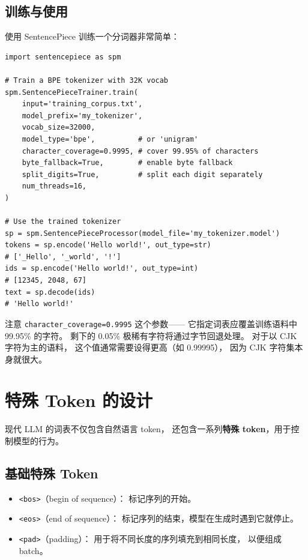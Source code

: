 \subsection{训练与使用}

使用 SentencePiece 训练一个分词器非常简单：

\begin{lstlisting}[caption={Training a SentencePiece tokenizer}]
import sentencepiece as spm

# Train a BPE tokenizer with 32K vocab
spm.SentencePieceTrainer.train(
    input='training_corpus.txt',
    model_prefix='my_tokenizer',
    vocab_size=32000,
    model_type='bpe',          # or 'unigram'
    character_coverage=0.9995, # cover 99.95% of characters
    byte_fallback=True,        # enable byte fallback
    split_digits=True,         # split each digit separately
    num_threads=16,
)

# Use the trained tokenizer
sp = spm.SentencePieceProcessor(model_file='my_tokenizer.model')
tokens = sp.encode('Hello world!', out_type=str)
# ['_Hello', '_world', '!']
ids = sp.encode('Hello world!', out_type=int)
# [12345, 2048, 67]
text = sp.decode(ids)
# 'Hello world!'
\end{lstlisting}

注意 \texttt{character\_coverage=0.9995} 这个参数——
它指定词表应覆盖训练语料中 99.95\% 的字符。
剩下的 0.05\% 极稀有字符将通过字节回退处理。
对于以 CJK 字符为主的语料，
这个值通常需要设得更高（如 0.99995），
因为 CJK 字符集本身就很大。

\section{特殊 Token 的设计}

现代 LLM 的词表不仅包含自然语言 token，
还包含一系列\textbf{特殊 token}，用于控制模型的行为。

\subsection{基础特殊 Token}

\begin{itemize}[noitemsep]
  \item \texttt{<bos>}（begin of sequence）：
        标记序列的开始。
  \item \texttt{<eos>}（end of sequence）：
        标记序列的结束，模型在生成时遇到它就停止。
  \item \texttt{<pad>}（padding）：
        用于将不同长度的序列填充到相同长度，
        以便组成 batch。
\end{itemize}

